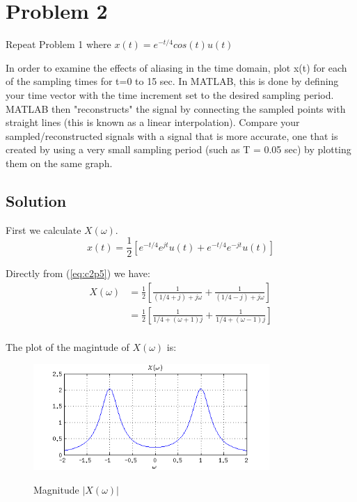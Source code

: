 \section*{Problem 2}

Repeat Problem 1 where $x(t) = e^{-t/4} cos(t) u(t)$

In order to examine the effects of aliasing in the time domain, plot x(t) 
for each of the sampling times for t=0 to 15 sec. 
In MATLAB, this is done by defining your time vector with the time increment set to the
desired sampling period. MATLAB then "reconstructs" the signal by 
connecting the sampled points with straight lines (this is known as a linear interpolation). 
Compare your sampled/reconstructed signals with a signal that is more accurate,
one that is created by using a very small sampling period (such as T = 0.05
sec) by plotting them on the same graph.

\subsection*{Solution}

First we calculate $X(\omega)$.
\begin{equation*}
x(t) = \frac{1}{2} \left[
	e^{-t/4}e^{jt} u(t) + e^{-t/4}e^{-jt}u(t) \right]
\end{equation*} 

Directly from (\ref{eq:c2p5}) we have:
\begin{equation*}
\begin{aligned}
X(\omega) &= \frac{1}{2} \left[
	\frac{1}{(1/4 + j) +j \omega} + 
	\frac{1}{(1/4 - j) +j \omega} \right] \\
          &= \frac{1}{2} \left[
	\frac{1}{1/4 + (\omega + 1)j} + 
	\frac{1}{1/4 + (\omega - 1)j} \right] \\
\end{aligned}
\end{equation*} 

The plot of the magintude of $X(\omega)$ is:

\begin{figure}[H]
\caption{Magnitude $|X(\omega)|$}
\centering
\includegraphics[width=0.8\textwidth]{figs/c3p21.png}
\label{fig:c3p21}
\end{figure} 

